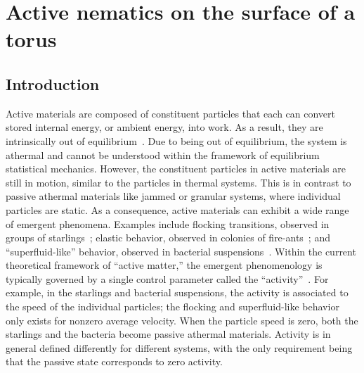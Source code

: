 \chapter{Active nematics on the surface of a torus}\label{c:3}
\section{Introduction}
Active materials are composed of constituent particles that each can convert stored internal energy, or ambient energy, into work.
As a result, they are intrinsically out of equilibrium~\cite{RN237,RN238,RN40}.
Due to being out of equilibrium, the system is athermal and cannot be understood within the framework of equilibrium statistical mechanics.
However, the constituent particles in active materials are still in motion, similar to the particles in thermal systems.
This is in contrast to passive athermal materials like jammed or granular systems, where individual particles are static.
As a consequence, active materials can exhibit a wide range of emergent phenomena.
Examples include flocking transitions, observed in groups of starlings~\cite{RN239,RN240}; elastic behavior, observed in colonies of fire-ants~\cite{RN242}; and ``superfluid-like'' behavior, observed in bacterial suspensions~\cite{RN270,RN271}.
Within the current theoretical framework of ``active matter,'' the emergent phenomenology is typically governed by a single control parameter called the ``activity''~\cite{RN237,RN238,RN40}.
For example, in the starlings and bacterial suspensions, the activity is associated to the speed of the individual particles; the flocking and superfluid-like behavior only exists for nonzero average velocity.
When the particle speed is zero, both the starlings and the bacteria become passive athermal materials.
Activity is in general defined differently for different systems, with the only requirement being that the passive state corresponds to zero activity.


